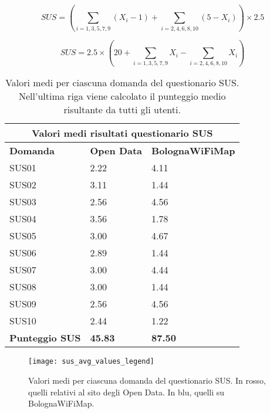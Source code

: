 \[
SUS = \left( \sum_{i=1,3,5,7,9} (X_i - 1) + \sum_{i=2,4,6,8,10} (5 - X_i) \right) \times 2.5
\]

\[
SUS = 2.5 \times \left( 20 + \sum_{i=1,3,5,7,9} X_i - \sum_{i=2,4,6,8,10} X_i \right)
\]

\begin{center}
    \begin{table}[H]
        \centering
        \begin{tabularx}{\textwidth}{|X|X|X|}
            \hline
            \multicolumn{3}{|c|}{\textbf{Valori medi risultati questionario SUS}} \\
            \hline
            \textbf{Domanda} & \textbf{Open Data} & \textbf{BolognaWiFiMap} \\
            \hline
            SUS01 & 2.22 & 4.11 \\
            SUS02 & 3.11 & 1.44 \\
            SUS03 & 2.56 & 4.56 \\
            SUS04 & 3.56 & 1.78 \\
            SUS05 & 3.00 & 4.67 \\
            SUS06 & 2.89 & 1.44 \\
            SUS07 & 3.00 & 4.44 \\
            SUS08 & 3.00 & 1.44 \\
            SUS09 & 2.56 & 4.56 \\
            SUS10 & 2.44 & 1.22 \\
            \hline
            \textbf{Punteggio SUS} & \textbf{45.83} & \textbf{87.50} \\
            \hline
        \end{tabularx}
        \caption[Valori medi totali e per domanda del questionario SUS]{Valori medi per ciascuna domanda del questionario SUS. Nell'ultima riga viene calcolato il punteggio medio risultante da tutti gli utenti.}
        \label{tab:sus_avg_values}
    \end{table}
\end{center}

\begin{figure}[H]
    \centering
    \texttt{[image: sus\_avg\_values\_legend]}
    \caption[Valori medi per ciascuna domanda del questionario SUS]{Valori medi per ciascuna domanda del questionario SUS. In rosso, quelli relativi al sito degli Open Data. In blu, quelli su BolognaWiFiMap.}
    \label{fig:sus_avg_values}
\end{figure}

